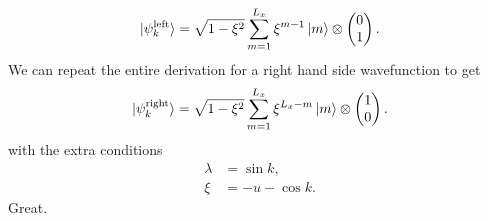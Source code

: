 \begin{align}
    \ket{\psi^{\textup{left}}_k} = \sqrt{1-\xi^2}\sum_{m=1}^{L_x} \xi^{m-1}\ket m \otimes \begin{pmatrix}
    0\\
    1
    \end{pmatrix}.
\end{align}
We can repeat the entire derivation for a right hand side wavefunction to get
\begin{align}
    \ket {\psi^{\textup{right}}_k} = \sqrt{1-\xi^2} \sum_{m=1}^{L_x} \xi^{L_x-m} \ket m \otimes  \begin{pmatrix}
    1\\
    0
    \end{pmatrix}.
\end{align}
with the extra conditions
\begin{align}
    \lambda &= \sin k,\\
    \xi &= -u-\cos k. 
\end{align}
Great.

